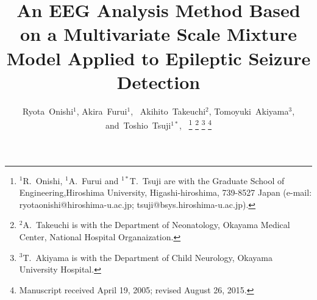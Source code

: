 \documentclass[journal]{IEEEtran}
\begin{document}
%
\title{An EEG Analysis Method Based on a Multivariate Scale Mixture Model Applied to Epileptic Seizure Detection}
%
%
%

\author{Ryota~Onishi${}^{1}$,
        Akira~Furui${}^{1}$,~
        Akihito~Takeuchi${}^{2}$,
        Tomoyuki~Akiyama${}^{3}$,
        and~Toshio~Tsuji${}^{1*}$,~%
\thanks{${}^{1}$R.~Onishi, ${}^{1}$A.~Furui and ${}^{1*}$T.~Tsuji are with the Graduate School of Engineering,Hiroshima University, Higashi-hiroshima, 739-8527 Japan (e-mail: ryotaonishi@hiroshima-u.ac.jp; tsuji@bsys.hiroshima-u.ac.jp).}%
\thanks{${}^{2}$A.~Takeuchi is with the Department of Neonatology, Okayama Medical Center, National Hospital Organaization.}
\thanks{${}^{3}$T.~Akiyama is with the Department of Child Neurology, Okayama University Hospital.}%
\thanks{Manuscript received April 19, 2005; revised August 26, 2015.}}
\end{document}
